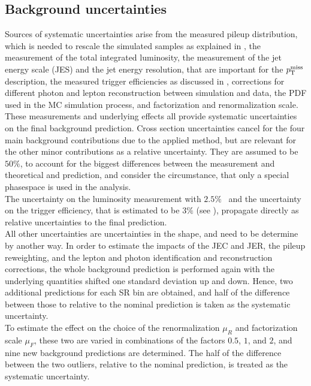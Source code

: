 \subsection{Background uncertainties}
Sources of systematic uncertainties arise from the measured pileup distribution,  which is needed to rescale the simulated samples as explained in , the measurement of the total integrated luminosity, the measurement of the jet energy scale (JES) and the jet energy resolution, that are important for the $p_{\mathrm{T}}^\text{miss}$ description, the measured trigger efficiencies as discussed in , corrections for different photon and lepton reconstruction between simulation and data, the PDF used in the MC simulation process, and factorization and renormalization scale.\\
These measurements and underlying effects all provide systematic uncertainties on the final background prediction. Cross section uncertainties cancel for the four main background contributions due to the applied method, but are relevant for the other minor contributions as a relative uncertainty. They are assumed to be $50\%$, to account for the biggest differences between the measurement and theoretical and prediction, and consider the circumstance, that only a special phasespace is used in the analysis.\\
The uncertainty on the luminosity measurement with $2.5\%$~\cite{LumiUncert} and the uncertainty on the trigger efficiency, that is estimated to be $3\%$ (see ), propagate directly as relative uncertainties to the final prediction.\\
All other uncertainties are uncertainties in the shape, and need to be determine by another way. In order to estimate the impacts of the JEC and JER, the pileup reweighting, and the lepton and photon identification and reconstruction corrections, the whole background prediction is performed again with the underlying quantities shifted one standard deviation up and down. Hence, two additional predictions for each SR bin are obtained, and half of the difference between those to relative to the nominal prediction is taken as the systematic uncertainty.\\
To estimate the effect on the choice of the renormalization $\mu_R$ and factorization scale $\mu_F$, these two are varied in combinations of the factors $0.5$, $1$, and $2$, and nine new background predictions are determined. The half of the difference between the two outliers, relative to the nominal prediction, is treated as the systematic uncertainty.\\
